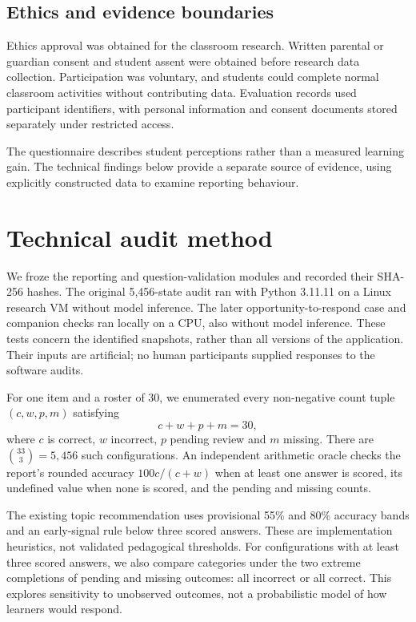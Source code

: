 \subsection{Ethics and evidence boundaries}

Ethics approval was obtained for the classroom research. Written parental or guardian consent and student assent were obtained before research data collection. Participation was voluntary, and students could complete normal classroom activities without contributing data. Evaluation records used participant identifiers, with personal information and consent documents stored separately under restricted access.

The questionnaire describes student perceptions rather than a measured learning gain. The technical findings below provide a separate source of evidence, using explicitly constructed data to examine reporting behaviour.

\section{Technical audit method}
We froze the reporting and question-validation modules and recorded their SHA-256 hashes. The original 5,456-state audit ran with Python 3.11.11 on a Linux research VM without model inference. The later opportunity-to-respond case and companion checks ran locally on a CPU, also without model inference. These tests concern the identified snapshots, rather than all versions of the application. Their inputs are artificial; no human participants supplied responses to the software audits.

For one item and a roster of 30, we enumerated every non-negative count tuple $(c,w,p,m)$ satisfying
\[
 c+w+p+m=30,
\]
where $c$ is correct, $w$ incorrect, $p$ pending review and $m$ missing. There are $\binom{33}{3}=5,456$ such configurations. An independent arithmetic oracle checks the report's rounded accuracy $100c/(c+w)$ when at least one answer is scored, its undefined value when none is scored, and the pending and missing counts.

The existing topic recommendation uses provisional 55\% and 80\% accuracy bands and an early-signal rule below three scored answers. These are implementation heuristics, not validated pedagogical thresholds. For configurations with at least three scored answers, we also compare categories under the two extreme completions of pending and missing outcomes: all incorrect or all correct. This explores sensitivity to unobserved outcomes, not a probabilistic model of how learners would respond.

